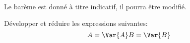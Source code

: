 \documentclass[a4paper,10pt]{/media/documents/Cours/Prof/Enseignements/tools/style/classDS}
\date{26 septemble 2013}
\begin{document}
\maketitle

\Calc
Le barème est donné à titre indicatif, il pourra être modifié.

\begin{Exo}[4.5]
		Développer et réduire les expressions suivantes:
		\begin{equation*}
            A = \Var{ A } \\
            B = \Var{ B }
		\end{equation*}
\end{Exo}
\end{document}
